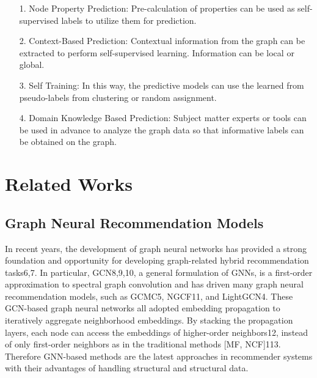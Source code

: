 \documentclass[a4paper,11pt]{report}
\begin{document}
\begin{itemize}
\item[1.] Node Property Prediction: Pre-calculation of properties can be used as self-supervised labels to utilize them for prediction.

\item[2.] Context-Based Prediction: Contextual information from the graph can be extracted to perform self-supervised learning. Information can be local or global.

\item[3.] Self Training: In this way, the predictive models can use the learned from pseudo-labels from clustering or random assignment.

\item[4.] Domain Knowledge Based Prediction: Subject matter experts or tools can be used in advance to analyze the graph data so that informative labels can be obtained on the graph.
\end{itemize}

\chapter{Related Works}
\section{Graph Neural Recommendation Models}
In recent years, the development of graph neural networks has provided a strong foundation and opportunity for developing graph-related hybrid recommendation tasks6,7. In particular, GCN8,9,10, a general formulation of GNNs, is a first-order approximation to spectral graph convolution and has driven many graph neural recommendation models, such as GCMC5, NGCF11, and LightGCN4. These GCN-based graph neural networks all adopted embedding propagation to iteratively aggregate neighborhood embeddings. By stacking the propagation layers, each node can access the embeddings of higher-order neighbors12, instead of only first-order neighbors as in the traditional methods [MF, NCF]113. Therefore GNN-based methods are the latest approaches in recommender systems with their advantages of handling structural and structural data.
\end{document}
